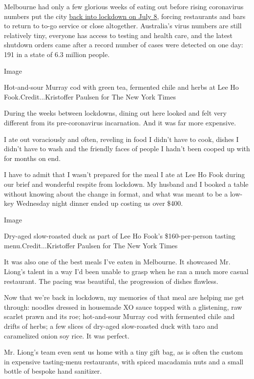 Melbourne had only a few glorious weeks of eating out before rising
coronavirus numbers put the city
\href{https://www.nytimes.com/2020/07/10/world/australia/melbourne-lockdown.html}{back
into lockdown on July 8}, forcing restaurants and bars to return to
to-go service or close altogether. Australia's virus numbers are still
relatively tiny, everyone has access to testing and health care, and the
latest shutdown orders came after a record number of cases were detected
on one day: 191 in a state of 6.3 million people.

Image

Hot-and-sour Murray cod with green tea, fermented chile and herbs at Lee
Ho Fook.Credit...Kristoffer Paulsen for The New York Times

During the weeks between lockdowns, dining out here looked and felt very
different from its pre-coronavirus incarnation. And it was far more
expensive.

I ate out voraciously and often, reveling in food I didn't have to cook,
dishes I didn't have to wash and the friendly faces of people I hadn't
been cooped up with for months on end.

I have to admit that I wasn't prepared for the meal I ate at Lee Ho Fook
during our brief and wonderful respite from lockdown. My husband and I
booked a table without knowing about the change in format, and what was
meant to be a low-key Wednesday night dinner ended up costing us over
\$400.

Image

Dry-aged slow-roasted duck as part of Lee Ho Fook's \$160-per-person
tasting menu.Credit...Kristoffer Paulsen for The New York Times

It was also one of the best meals I've eaten in Melbourne. It showcased
Mr. Liong's talent in a way I'd been unable to grasp when he ran a much
more casual restaurant. The pacing was beautiful, the progression of
dishes flawless.

Now that we're back in lockdown, my memories of that meal are helping me
get through: noodles dressed in housemade XO sauce topped with a
glistening, raw scarlet prawn and its roe; hot-and-sour Murray cod with
fermented chile and drifts of herbs; a few slices of dry-aged
slow-roasted duck with taro and caramelized onion soy rice. It was
perfect.

Mr. Liong's team even sent us home with a tiny gift bag, as is often the
custom in expensive tasting-menu restaurants, with spiced macadamia nuts
and a small bottle of bespoke hand sanitizer.

